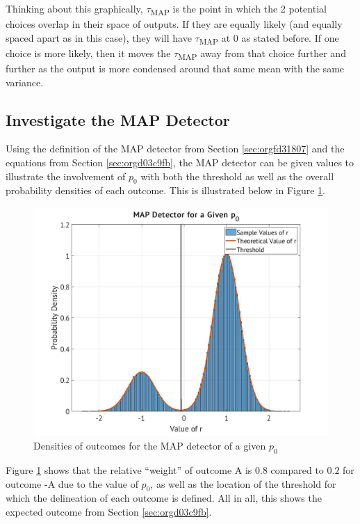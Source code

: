 \documentclass[a4paper, 11pt]{article}
\begin{document}
Thinking about this graphically, \(\tau\)\textsubscript{MAP} is the point in which the 2 potential choices overlap in their space of outputs. If they are equally likely (and equally spaced apart as in this case), they will have \(\tau\)\textsubscript{MAP} at 0 as stated before. If one choice is more likely, then it moves the \(\tau\)\textsubscript{MAP} away from that choice further and further as the output is more condensed around that same mean with the same variance.

\subsection{Investigate the MAP Detector}
\label{sec:orgb926a9a}
Using the definition of the MAP detector from Section \ref{sec:orgfd31807} and the equations from Section \ref{sec:orgd03c9fb}, the MAP detector can be given values to illustrate the involvement of \(p_0\) with both the threshold as well as the overall probability densities of each outcome.
This is illustrated below in Figure \ref{fig:MAPCurve}.

\begin{figure}[htbp]
\centering
\includegraphics[width=.9\linewidth]{./Images/figure2_2.jpg}
\caption{\label{fig:MAPCurve}Densities of outcomes for the MAP detector of a given \(p_0\)}
\end{figure}

Figure \ref{fig:MAPCurve} shows that the relative ``weight'' of outcome A is \(0.8\) compared to \(0.2\) for outcome -A due to the value of \(p_0\), as well as the location of the threshold for which the delineation of each outcome is defined. All in all, this shows the expected outcome from Section \ref{sec:orgd03c9fb}.
\end{document}
